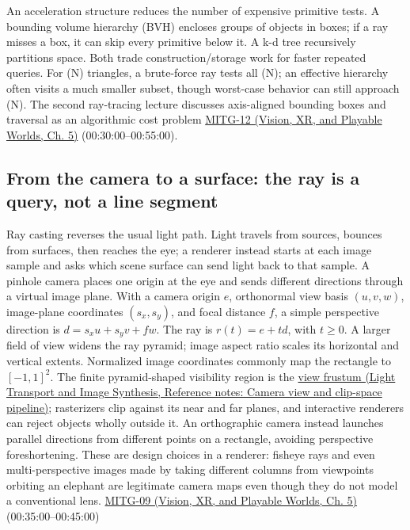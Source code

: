 An acceleration structure reduces the number of expensive primitive tests. A bounding volume hierarchy (BVH) encloses groups of objects in boxes; if a ray misses a box, it can skip every primitive below it. A k-d tree recursively partitions space. Both trade construction/storage work for faster repeated queries. For (N) triangles, a brute-force ray tests all (N); an effective hierarchy often visits a much smaller subset, though worst-case behavior can still approach (N). The second ray-tracing lecture discusses axis-aligned bounding boxes and traversal as an algorithmic cost problem \href{../07-Vision-XR-and-Playable-Worlds/main.pdf\#nameddest=04-visual-computing-ii-ch036-mitg-12---ray-tracing-ii}{MITG-12 (Vision, XR, and Playable Worlds, Ch. 5)} (00:30:00--00:55:00).

\subsection{From the camera to a surface: the ray is a query, not a line segment}\label{04-visual-computing-ii-ch028-from-the-camera-to-a-surface-the-ray-is-a-query-not-a-line-segment}

Ray casting reverses the usual light path. Light travels from sources, bounces from surfaces, then reaches the eye; a renderer instead starts at each image sample and asks which scene surface can send light back to that sample. A pinhole camera places one origin at the eye and sends different directions through a virtual image plane. With a camera origin \(e\), orthonormal view basis \((u,v,w)\), image-plane coordinates \((s_x,s_y)\), and focal distance \(f\), a simple perspective direction is \(d=s_xu+s_yv+fw\). The ray is \(r(t)=e+td\), with \(t\geq 0\). A larger field of view widens the ray pyramid; image aspect ratio scales its horizontal and vertical extents. Normalized image coordinates commonly map the rectangle to \([-1,1]^2\). The finite pyramid-shaped visibility region is the \href{../04-Light-Transport-and-Image-Synthesis/main.pdf\#nameddest=appendix-1c07d64f5e70}{view frustum (Light Transport and Image Synthesis, Reference notes: Camera view and clip-space pipeline)}; rasterizers clip against its near and far planes, and interactive renderers can reject objects wholly outside it. An orthographic camera instead launches parallel directions from different points on a rectangle, avoiding perspective foreshortening. These are design choices in a renderer: fisheye rays and even multi-perspective images made by taking different columns from viewpoints orbiting an elephant are legitimate camera maps even though they do not model a conventional lens. \href{../07-Vision-XR-and-Playable-Worlds/main.pdf\#nameddest=04-visual-computing-ii-ch036-mitg-09---ray-casting}{MITG-09 (Vision, XR, and Playable Worlds, Ch. 5)} (00:35:00--00:45:00)

